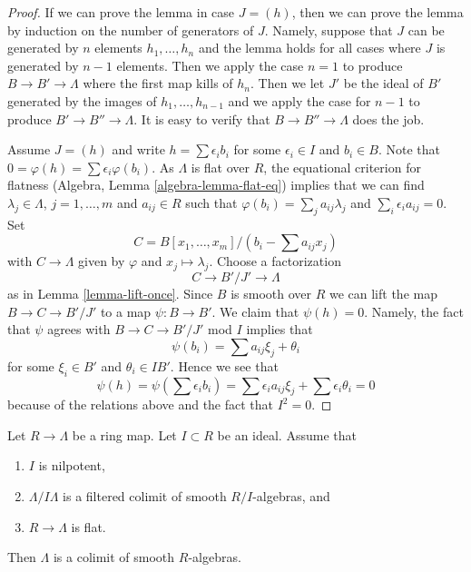 \begin{proof}
If we can prove the lemma in case $J = (h)$, then we can prove the
lemma by induction on the number of generators of $J$. Namely, suppose
that $J$ can be generated by $n$ elements $h_1, \ldots, h_n$ and the
lemma holds for all cases where $J$ is generated by $n - 1$ elements.
Then we apply the case $n = 1$ to produce $B \to B' \to \Lambda$
where the first map kills of $h_n$. Then we let $J'$ be the
ideal of $B'$ generated by the images of $h_1, \ldots, h_{n - 1}$
and we apply the case for $n - 1$ to produce $B' \to B'' \to \Lambda$.
It is easy to verify that $B \to B'' \to \Lambda$ does the job.

\medskip\noindent
Assume $J = (h)$ and write $h = \sum \epsilon_i b_i$
for some $\epsilon_i \in I$ and $b_i \in B$. Note that
$0 = \varphi(h) = \sum \epsilon_i \varphi(b_i)$.
As $\Lambda$ is flat over $R$, the equational criterion for
flatness (Algebra, Lemma \ref{algebra-lemma-flat-eq})
implies that we can find $\lambda_j \in \Lambda$,
$j = 1, \ldots, m$ and $a_{ij} \in R$ such that
$\varphi(b_i) = \sum_j a_{ij} \lambda_j$ and $\sum_i \epsilon_i a_{ij} = 0$.
Set
$$
C = B[x_1, \ldots, x_m]/(b_i - \sum a_{ij} x_j)
$$
with $C \to \Lambda$ given by $\varphi$ and $x_j \mapsto \lambda_j$.
Choose a factorization
$$
C \to B'/J' \to \Lambda
$$
as in Lemma \ref{lemma-lift-once}. Since $B$ is smooth over $R$ we can
lift the map $B \to C \to B'/J'$ to a map $\psi : B \to B'$. We claim that
$\psi(h) = 0$. Namely, the fact that $\psi$ agrees with
$B \to C \to B'/J'$ mod $I$ implies that
$$
\psi(b_i) = \sum a_{ij} \xi_j + \theta_i
$$
for some $\xi_i \in B'$ and $\theta_i \in IB'$. Hence we see that
$$
\psi(h) = \psi(\sum \epsilon_i b_i) =
\sum \epsilon_i a_{ij} \xi_j + \sum \epsilon_i \theta_i = 0
$$
because of the relations above and the fact that $I^2 = 0$.
\end{proof}

\begin{proposition}
\label{proposition-lift}
Let $R \to \Lambda$ be a ring map. Let $I \subset R$ be an ideal.
Assume that
\begin{enumerate}
\item $I$ is nilpotent,
\item $\Lambda/I\Lambda$ is a filtered colimit of smooth $R/I$-algebras, and
\item $R \to \Lambda$ is flat.
\end{enumerate}
Then $\Lambda$ is a colimit of smooth $R$-algebras.
\end{proposition}

